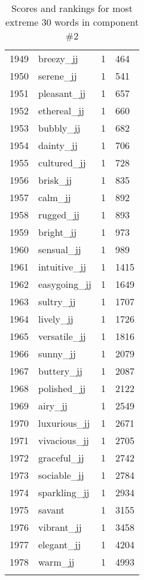 \begin{longtable}[!htbp]{| rlr@{.}l |}
    1949 & breezy\_jj & 1 & 464 \\
    1950 & serene\_jj & 1 & 541 \\
    1951 & pleasant\_jj & 1 & 657 \\
    1952 & ethereal\_jj & 1 & 660 \\
    1953 & bubbly\_jj & 1 & 682 \\
    1954 & dainty\_jj & 1 & 706 \\
    1955 & cultured\_jj & 1 & 728 \\
    1956 & brisk\_jj & 1 & 835 \\
    1957 & calm\_jj & 1 & 892 \\
    1958 & rugged\_jj & 1 & 893 \\
    1959 & bright\_jj & 1 & 973 \\
    1960 & sensual\_jj & 1 & 989 \\
    1961 & intuitive\_jj & 1 & 1415 \\
    1962 & easygoing\_jj & 1 & 1649 \\
    1963 & sultry\_jj & 1 & 1707 \\
    1964 & lively\_jj & 1 & 1726 \\
    1965 & versatile\_jj & 1 & 1816 \\
    1966 & sunny\_jj & 1 & 2079 \\
    1967 & buttery\_jj & 1 & 2087 \\
    1968 & polished\_jj & 1 & 2122 \\
    1969 & airy\_jj & 1 & 2549 \\
    1970 & luxurious\_jj & 1 & 2671 \\
    1971 & vivacious\_jj & 1 & 2705 \\
    1972 & graceful\_jj & 1 & 2742 \\
    1973 & sociable\_jj & 1 & 2784 \\
    1974 & sparkling\_jj & 1 & 2934 \\
    1975 & savant & 1 & 3155 \\
    1976 & vibrant\_jj & 1 & 3458 \\
    1977 & elegant\_jj & 1 & 4204 \\
    1978 & warm\_jj & 1 & 4993 \\
    \hline
    \caption{Scores and rankings for most extreme 30 words in component \#2} \\
\end{longtable}
